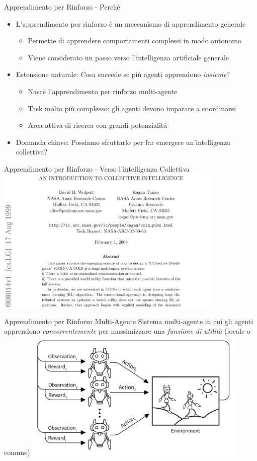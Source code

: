 \documentclass[presentation, 10pt,aspectratio=169]{beamer}\mode<presentation>{\usetheme{AMSBolognaFC}}
\begin{document}
\begin{frame}{Apprendimento per Rinforzo - Perché}
	\begin{itemize}
		\item L'apprendimento per rinforzo è un meccanismo di apprendimento \alert{generale}
		\begin{itemize}
			\item Permette di apprendere comportamenti complessi in modo autonomo
			\item Viene considerato un passo verso l'intelligenza artificiale generale
		\end{itemize}
		\item \alert{Estensione naturale}: Cosa succede se più agenti apprendono \emph{insieme}?
		\begin{itemize}
			\item Nasce l'apprendimento per rinforzo \alert{multi-agente}
			\item Task molto più complesso: gli agenti devono imparare a coordinarsi
			\item Area attiva di ricerca con grandi potenzialità
		\end{itemize}
		\item \alert{Domanda chiave}: Possiamo sfruttarlo per far emergere un'intelligenza collettiva?
	\end{itemize}
\end{frame}
\begin{frame}{Apprendimento per Rinforzo - Verso l'intelligenza Collettiva}
	\centering
	\href{https://arxiv.org/abs/cs/9908014}{\includegraphics[height=7cm]{img/COIN.png}}
\end{frame}
\begin{frame}{Apprendimento per Rinforzo Multi-Agente}
	Sistema multi-agente in cui gli agenti apprendono \emph{concorrentemente} per massimizzare una \emph{funzione di utilità} (locale o comune)
	\centering
	\includegraphics[width=0.8\textwidth]{img/marl.png}
\end{frame}
\end{document}
